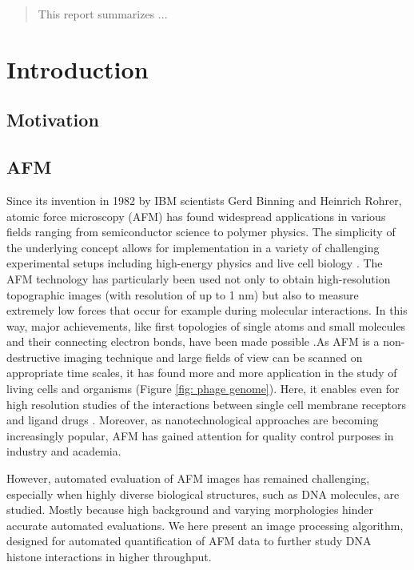 \documentclass{article}
\begin{document}
\begin{abstract}
This report summarizes ...

\end{abstract}

\section{Introduction}\label{sec: Introduction}
\subsection{Motivation}\label{sec: Motivation}


\subsection{AFM}\label{sec: AFM}
Since its invention in 1982 by IBM scientists Gerd Binning and Heinrich Rohrer, atomic force microscopy (AFM) has found widespread applications in various fields ranging from semiconductor science to polymer physics. The simplicity of the underlying concept allows for implementation in a variety of challenging experimental setups including high-energy physics  \cite{fischbach2001new} and live cell biology  \cite{evans2007forces}. The AFM technology has particularly been used not only to obtain high-resolution topographic images (with resolution of up to 1 nm) but also to measure extremely low forces that occur for example during molecular interactions. In this way, major achievements, like first topologies of single atoms and small molecules and their connecting electron bonds, have been made possible  \cite{hoffmann2001direct}.As AFM is a non- destructive imaging technique and large fields of view can be scanned on appropriate time scales, it has found more and more application in the study of living cells and organisms (Figure \ref{fig: phage genome}). Here, it enables even for high resolution studies of the interactions between single cell membrane receptors and ligand drugs \cite{willemsen2000biomolecular}. Moreover, as nanotechnological approaches are becoming increasingly popular, AFM has gained attention for quality control purposes in industry and academia. 

However, automated evaluation of AFM images has remained challenging, especially when highly diverse biological structures, such as DNA molecules, are studied. Mostly because high background and varying morphologies hinder accurate automated evaluations. We here present an image processing algorithm, designed for automated quantification of AFM data to further study DNA histone interactions in higher throughput. 
\end{document}
